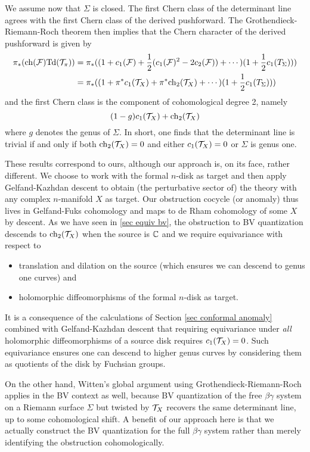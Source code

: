 We assume now that $\Sigma$ is closed.
The first Chern class of the determinant line agrees with the first Chern class of the derived pushforward.
The Grothendieck-Riemann-Roch theorem then implies that the Chern character of the derived pushforward 
is given by 
\begin{align*}
\pi_*( {\rm ch}(\mathcal F) {\rm Td}(\mathcal T_\pi)) &= \pi_*( (1 + c_1(\mathcal F) + \frac{1}{2}(c_1(\mathcal F)^2 - 2c_2(\mathcal F)) + \cdots)(1 +\frac{1}{2}c_1(T_\Sigma)))\\
&= \pi_*( (1 + \pi^* c_1(\mathcal T_X) + \pi^* {\rm ch}_2(\mathcal T_X) + \cdots)(1 +\frac{1}{2}c_1(T_\Sigma)))
\end{align*}
and the first Chern class is the component of cohomological degree 2, namely
\[
(1-g) c_1(\mathcal T_X) + {\rm ch}_2(\mathcal T_X) 
\]
where $g$ denotes the genus of $\Sigma$.
In short, one finds that the determinant line is trivial if and only if 
both ${\rm ch}_2(\mathcal T_X) = 0$ and either $c_1(\mathcal T_X) = 0$ or $\Sigma$ is genus one.

These results correspond to ours,
although our approach is, on its face, rather different.
We choose to work with the formal $n$-disk as target 
and then apply Gelfand-Kazhdan descent to obtain (the perturbative sector of) the theory with any complex $n$-manifold $X$ as target.
Our obstruction cocycle (or anomaly) thus lives in Gelfand-Fuks cohomology
and maps to de Rham cohomology of some $X$ by descent.
As we have seen in \ref{sec equiv bv}, the obstruction to BV quantization descends to ${\rm ch}_2(\mathcal T_X)$ when the source is $\mathbb C$ 
and we require equivariance with respect to
\begin{itemize}
\item translation and dilation on the source (which ensures we can descend to genus one curves) and
\item holomorphic diffeomorphisms of the formal $n$-disk as target.
\end{itemize}
It is a consequence of the calculations of Section \ref{sec conformal anomaly} combined with Gelfand-Kazhdan descent that requiring equivariance under {\em all} holomorphic diffeomorphisms of a source disk requires $c_1(\mathcal T_X) = 0$.
Such equivariance ensures one can descend to higher genus curves by considering them as quotients of the disk by Fuchsian groups.

\begin{rmk}
On the other hand, Witten's global argument using Grothendieck-Riemann-Roch applies in the BV context as well,
because BV quantization of the free $\beta\gamma$ system 
on a Riemann surface $\Sigma$ but twisted by $\mathcal T_X$ recovers the same determinant line, 
up to some cohomological shift.
A benefit of our approach here is that we actually construct the BV quantization for the full $\beta\gamma$ system
rather than merely identifying the obstruction cohomologically.
\end{rmk}

